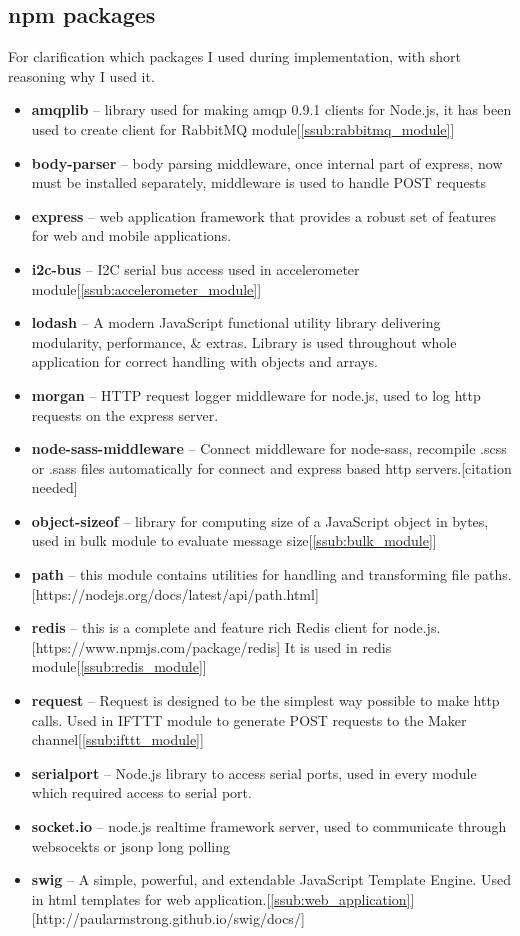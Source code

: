\subsection{npm packages} %
\label{sub:npm_packages}
For clarification which packages I used during implementation, with short reasoning why I used it.
\begin{itemize}
	\item \textbf{amqplib} -- library used for making amqp 0.9.1 clients for Node.js, it has been used to create client for RabbitMQ module[\ref{ssub:rabbitmq_module}]
   	\item \textbf{body-parser} -- body parsing middleware, once internal part of express, now must be installed separately, middleware is used to handle POST requests
    \item \textbf{express} -- web application framework that provides a robust set of features for web and mobile applications.
    \item \textbf{i2c-bus} -- I2C serial bus access used in accelerometer module[\ref{ssub:accelerometer_module}]
    \item \textbf{lodash} -- A modern JavaScript functional utility library delivering modularity, performance, & extras. Library is used throughout whole application for correct handling with objects and arrays.
    \item \textbf{morgan} -- HTTP request logger middleware for node.js, used to log http requests on the express server.
    \item \textbf{node-sass-middleware} -- Connect middleware for node-sass, recompile .scss or .sass files automatically for connect and express based http servers.[citation needed]
    \item \textbf{object-sizeof} -- library for computing size of a JavaScript object in bytes, used in bulk module to evaluate message size[\ref{ssub:bulk_module}]
    \item \textbf{path} -- this module contains utilities for handling and transforming file paths.[https://nodejs.org/docs/latest/api/path.html]
    \item \textbf{redis} -- this is a complete and feature rich Redis client for node.js.[https://www.npmjs.com/package/redis] It is used in redis module[\ref{ssub:redis_module}]
    \item \textbf{request} -- Request is designed to be the simplest way possible to make http calls. Used in IFTTT module to generate POST requests to the Maker channel[\ref{ssub:ifttt_module}]
    \item \textbf{serialport} -- Node.js library to access serial ports, used in every module which required access to serial port.
    \item \textbf{socket.io} -- node.js realtime framework server, used to communicate through websocekts or jsonp long polling
    \item \textbf{swig} -- A simple, powerful, and extendable JavaScript Template Engine. Used in html templates for web application.[\ref{ssub:web_application}][http://paularmstrong.github.io/swig/docs/]
\end{itemize}
